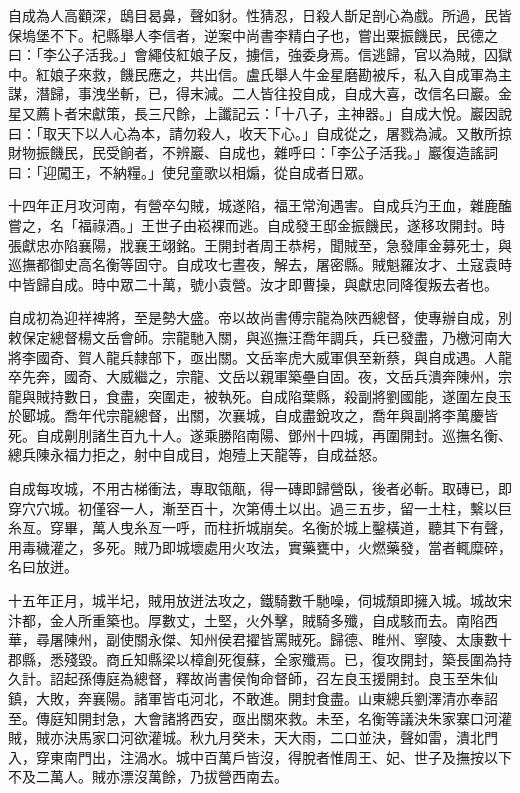 \begin{pinyinscope}
自成為人高顴深，鴟目曷鼻，聲如豺。性猜忍，日殺人斮足剖心為戲。所過，民皆保塢堡不下。杞縣舉人李信者，逆案中尚書李精白子也，嘗出粟振饑民，民德之曰：「李公子活我。」會繩伎紅娘子反，擄信，強委身焉。信逃歸，官以為賊，囚獄中。紅娘子來救，饑民應之，共出信。盧氏舉人牛金星磨勘被斥，私入自成軍為主謀，潛歸，事洩坐斬，已，得末減。二人皆往投自成，自成大喜，改信名曰巖。金星又薦卜者宋獻策，長三尺餘，上讖記云：「十八子，主神器。」自成大悅。巖因說曰：「取天下以人心為本，請勿殺人，收天下心。」自成從之，屠戮為減。又散所掠財物振饑民，民受餉者，不辨巖、自成也，雜呼曰：「李公子活我。」巖復造謠詞曰：「迎闖王，不納糧。」使兒童歌以相煽，從自成者日眾。

十四年正月攻河南，有營卒勾賊，城遂陷，福王常洵遇害。自成兵汋王血，雜鹿醢嘗之，名「福祿酒。」王世子由崧裸而逃。自成發王邸金振饑民，遂移攻開封。時張獻忠亦陷襄陽，戕襄王翊銘。王開封者周王恭枵，聞賊至，急發庫金募死士，與巡撫都御史高名衡等固守。自成攻七晝夜，解去，屠密縣。賊魁羅汝才、土寇袁時中皆歸自成。時中眾二十萬，號小袁營。汝才即曹操，與獻忠同降復叛去者也。

自成初為迎祥裨將，至是勢大盛。帝以故尚書傅宗龍為陜西總督，使專辦自成，別敕保定總督楊文岳會師。宗龍馳入關，與巡撫汪喬年調兵，兵已發盡，乃檄河南大將李國奇、賀人龍兵隸部下，亟出關。文岳率虎大威軍俱至新蔡，與自成遇。人龍卒先奔，國奇、大威繼之，宗龍、文岳以親軍築壘自固。夜，文岳兵潰奔陳州，宗龍與賊持數日，食盡，突圍走，被執死。自成陷葉縣，殺副將劉國能，遂圍左良玉於郾城。喬年代宗龍總督，出關，次襄城，自成盡銳攻之，喬年與副將李萬慶皆死。自成劓刖諸生百九十人。遂乘勝陷南陽、鄧州十四城，再圍開封。巡撫名衡、總兵陳永福力拒之，射中自成目，炮殪上天龍等，自成益怒。

自成每攻城，不用古梯衝法，專取瓴甋，得一磚即歸營臥，後者必斬。取磚已，即穿穴穴城。初僅容一人，漸至百十，次第傅土以出。過三五步，留一土柱，繫以巨糸亙。穿畢，萬人曳糸亙一呼，而柱折城崩矣。名衡於城上鑿橫道，聽其下有聲，用毒穢灌之，多死。賊乃即城壞處用火攻法，實藥甕中，火燃藥發，當者輒糜碎，名曰放迸。

十五年正月，城半圮，賊用放迸法攻之，鐵騎數千馳噪，伺城頹即擁入城。城故宋汴都，金人所重築也。厚數丈，土堅，火外擊，賊騎多殲，自成駭而去。南陷西華，尋屠陳州，副使關永傑、知州侯君擢皆罵賊死。歸德、睢州、寧陵、太康數十郡縣，悉殘毀。商丘知縣梁以樟創死復蘇，全家殲焉。已，復攻開封，築長圍為持久計。詔起孫傳庭為總督，釋故尚書侯恂命督師，召左良玉援開封。良玉至朱仙鎮，大敗，奔襄陽。諸軍皆屯河北，不敢進。開封食盡。山東總兵劉澤清亦奉詔至。傳庭知開封急，大會諸將西安，亟出關來救。未至，名衡等議決朱家寨口河灌賊，賊亦決馬家口河欲灌城。秋九月癸未，天大雨，二口並決，聲如雷，潰北門入，穿東南門出，注渦水。城中百萬戶皆沒，得脫者惟周王、妃、世子及撫按以下不及二萬人。賊亦漂沒萬餘，乃拔營西南去。


\end{pinyinscope}
